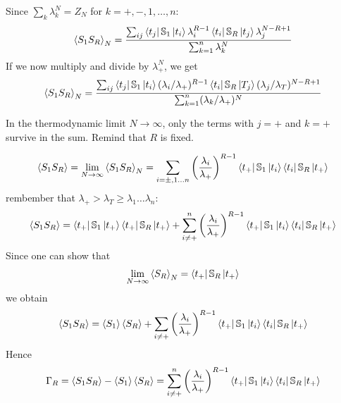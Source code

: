 \documentclass[../main/main.tex]{subfiles}
\begin{document}
Since \( \sum_{k}^{} \lambda _k^N = Z_N \) for \( k=+,-,1,\dots,n \):
\begin{equation}
  \expval{S_1 S_R}_N = \frac{\sum_{ij}^{} \bra{t_j} \mathbb{S}_1 \ket{t_i} \lambda _i^{R-1} \bra{t_i} \mathbb{S}_R \ket{t_j} \lambda _j^{N-R+1}      }{\sum_{k=1}^{n} \lambda _k^N  }
\end{equation}
If we now multiply and divide by \( \lambda _+^N \), we get
\begin{equation}
  \expval{S_1 S_R}_N = \frac{\sum_{ij}^{} \bra{t_j} \mathbb{S}_1 \ket{t_i} (\lambda _i/ \lambda _+)^{R-1}  \bra{t_i} \mathbb{S}_R \ket{T_j} (\lambda _j / \lambda _T)^{N-R+1}    }{\sum_{k=1}^{n} (\lambda _k  / \lambda _+)^{N} }
\end{equation}
\begin{remark}
In the thermodynamic limit \( N \rightarrow \infty  \), only the terms with \( j=+ \) and \( k=+ \) survive in the sum. Remind that \( R \) is fixed.
\end{remark}
\begin{equation}
\expval{S_1 S_R} =   \lim_{N \rightarrow \infty } \expval{S_1 S_R}_N = \sum_{i= \pm,1 \dots n}^{} \qty(\frac{\lambda _i}{\lambda _+})^{R-1} \bra{t_+} \mathbb{S}_1 \ket{t_i} \bra{t_i} \mathbb{S}_R \ket{t_+}
\end{equation}
rembember that \( \lambda _+ > \lambda _T \ge \lambda _1 \dots \lambda _n \):
\begin{equation}
  \expval{S_1 S_R} = \bra{t_+} \mathbb{S}_1 \ket{t_+} \bra{t_+} \mathbb{S}_R \ket{t_+} +   \sum_{i \neq +}^{n} \qty(\frac{\lambda _i}{\lambda _+})^{R-1} \bra{t_+} \mathbb{S}_1 \ket{t_i} \bra{t_i} \mathbb{S}_R \ket{t_+}
\end{equation}
Since one can show that
\begin{equation}
  \lim_{N \rightarrow \infty } \expval{S_R}_N = \bra{t_+} \mathbb{S}_R \ket{t_+}
\end{equation}
we obtain
\begin{equation}
  \expval{S_1 S_R} = \expval{S_1} \expval{S_R} + \sum_{i \neq +}^{}  \qty(\frac{\lambda _i}{\lambda _+})^{R-1} \bra{t_+} \mathbb{S}_1 \ket{t_i} \bra{t_i} \mathbb{S}_R \ket{t_+}
\end{equation}
Hence
\begin{equation}
\Gamma _R =   \expval{S_1 S_R} - \expval{S_1}\expval{S_R} = \sum_{i \neq +}^{n} \qty(\frac{\lambda _i}{\lambda _+})^{R-1} \bra{t_+} \mathbb{S}_1 \ket{t_i} \bra{t_i} \mathbb{S}_R \ket{t_+}
\end{equation}
\end{document}
